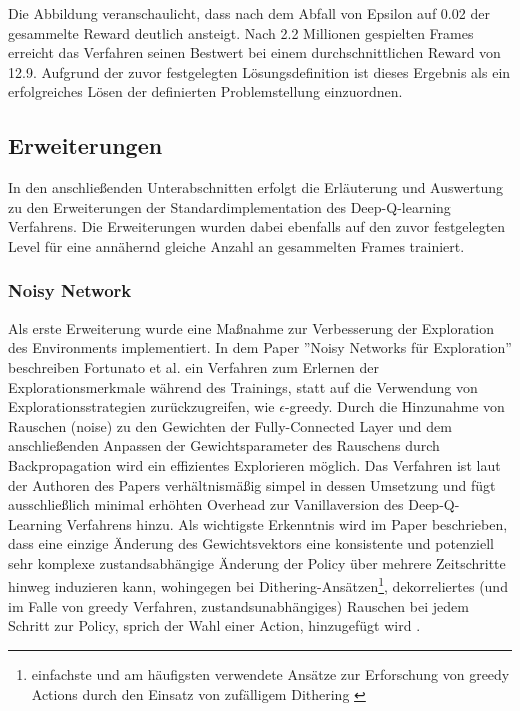 \documentclass[11pt]{scrartcl}
\begin{document}
\newpage
Die Abbildung veranschaulicht, dass nach dem Abfall von Epsilon auf 0.02 der gesammelte Reward deutlich
ansteigt. Nach 2.2 Millionen gespielten Frames erreicht das Verfahren seinen Bestwert bei einem
durchschnittlichen Reward von 12.9. Aufgrund der zuvor festgelegten Lösungsdefinition ist dieses
Ergebnis als ein erfolgreiches Lösen der definierten Problemstellung einzuordnen.

\subsection{Erweiterungen}
In den anschließenden Unterabschnitten erfolgt die Erläuterung und Auswertung zu den Erweiterungen der Standardimplementation des Deep-Q-learning Verfahrens. Die Erweiterungen wurden dabei ebenfalls auf den
zuvor festgelegten Level für eine annähernd gleiche Anzahl an gesammelten Frames trainiert.
\subsubsection{Noisy Network}
Als erste Erweiterung wurde eine Maßnahme zur Verbesserung der Exploration des Environments implementiert.
In dem Paper ''Noisy Networks für Exploration'' beschreiben Fortunato et al.\cite[~S.1 f.]{FAPMOGM2017}
ein Verfahren zum Erlernen der Explorationsmerkmale während des Trainings, statt auf die Verwendung von
Explorationsstrategien zurückzugreifen, wie $\epsilon$-greedy. Durch die Hinzunahme von Rauschen (noise)
zu den Gewichten der Fully-Connected Layer und dem anschließenden Anpassen der Gewichtsparameter des
Rauschens durch Backpropagation wird ein effizientes Explorieren möglich. Das Verfahren ist laut der
Authoren des Papers verhältnismäßig simpel in dessen Umsetzung und fügt ausschließlich minimal erhöhten
Overhead zur Vanillaversion des Deep-Q-Learning Verfahrens hinzu. Als wichtigste Erkenntnis wird im Paper
beschrieben, dass eine einzige Änderung des Gewichtsvektors eine konsistente und potenziell sehr komplexe
zustandsabhängige Änderung der Policy über mehrere Zeitschritte hinweg induzieren kann, wohingegen bei
Dithering-Ansätzen\footnote{einfachste und am häufigsten verwendete Ansätze zur Erforschung von greedy
Actions durch den Einsatz von zufälligem Dithering \cite[~S.2]{ORRW2019}}, dekorreliertes (und im Falle von
greedy Verfahren, zustandsunabhängiges) Rauschen bei jedem Schritt zur Policy, sprich der Wahl einer
Action, hinzugefügt wird \cite[~S.2]{FAPMOGM2017}. 
\end{document}
